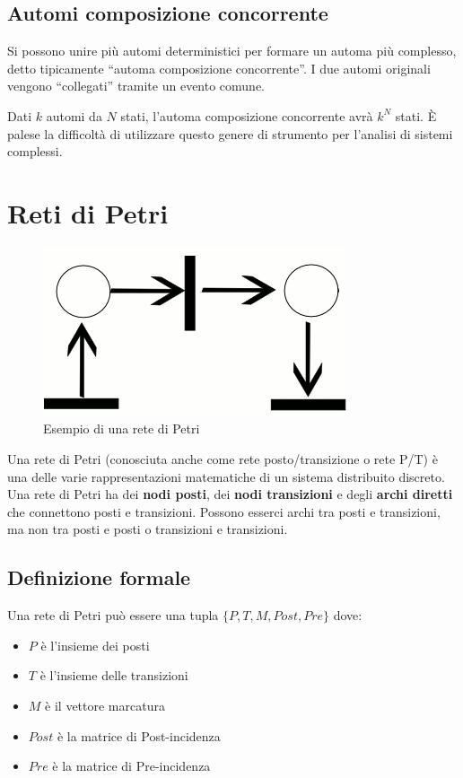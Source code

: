 \documentclass[a4paper]{report}
\newcommand{\bo}{\bfseries }
\begin{document}
\subsection{Automi composizione concorrente}
Si possono unire pi\`u automi deterministici per formare un automa
pi\`u complesso, detto tipicamente ``automa composizione
concorrente''. I due automi originali vengono ``collegati'' tramite un
evento comune. 

Dati $k$ automi da $N$ stati, l'automa composizione concorrente avr\`a
$k^N$ stati. \`E palese la difficolt\`a di utilizzare questo genere di
strumento per l'analisi di sistemi complessi.

\section{Reti di Petri}
\begin{figure}[!h]
  \begin{center}
    \includegraphics[scale=0.5]{./figures/petri.png}
    \caption{Esempio di una rete di Petri}\label{fig:petri01}
  \end{center}
\end{figure} 

Una rete di Petri (conosciuta anche come rete posto/transizione o rete
P/T) \`e una delle varie rappresentazioni matematiche di un sistema
distribuito discreto. Una rete di Petri ha dei {\bo nodi posti}, dei
{\bo nodi transizioni} e degli {\bo archi diretti} che connettono
posti e transizioni. Possono esserci archi tra posti e transizioni, ma
non tra posti e posti o transizioni e transizioni. 

\subsection{Definizione formale}
Una rete di Petri pu\`o essere una tupla $\{ P, T, M, Post, Pre \}$ dove:
\begin{itemize}
\item $P$ \`e l'insieme dei posti
\item $T$ \`e l'insieme delle transizioni
\item $M$ \`e il vettore marcatura
\item $Post$ \`e la matrice di Post-incidenza 
\item $Pre$ \`e la matrice di Pre-incidenza 
\end{itemize}
\end{document}
